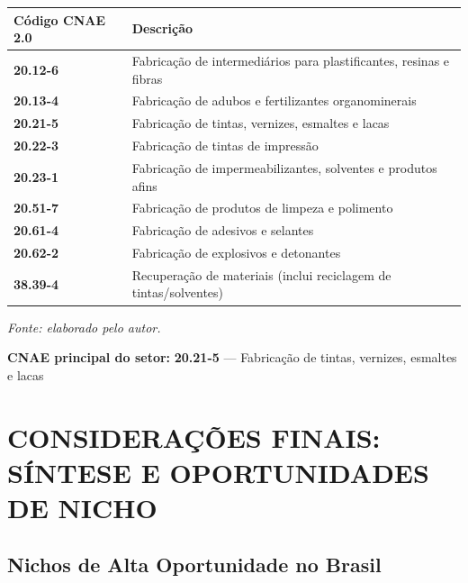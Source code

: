 \documentclass[
  12pt,
  a4paper,
  oneside,
  brazil,
  chapter=TITLE
]{article}
\newcommand{\secbreak}{\clearpage}
\let\oldsection\section
\renewcommand{\section}{\secbreak\oldsection}
\newcommand{\quadrofonte}[1]{\par\noindent\textit{Fonte: #1}\vspace{1em}\par}
\begin{document}
{\def\LTcaptype{none} %
\begin{longtable}[]{@{}
  >{\raggedright\arraybackslash}p{}
  >{\raggedright\arraybackslash}p{}@{}}
\toprule\noalign{}
\begin{minipage}[b]{\linewidth}\raggedright
Código CNAE 2.0
\end{minipage} & \begin{minipage}[b]{\linewidth}\raggedright
Descrição
\end{minipage} \\
\midrule\noalign{}
\endhead
\bottomrule\noalign{}
\endlastfoot
\textbf{20.12-6} & Fabricação de intermediários para plastificantes,
resinas e fibras \\
\textbf{20.13-4} & Fabricação de adubos e fertilizantes
organominerais \\
\textbf{20.21-5} & Fabricação de tintas, vernizes, esmaltes e lacas \\
\textbf{20.22-3} & Fabricação de tintas de impressão \\
\textbf{20.23-1} & Fabricação de impermeabilizantes, solventes e
produtos afins \\
\textbf{20.51-7} & Fabricação de produtos de limpeza e polimento \\
\textbf{20.61-4} & Fabricação de adesivos e selantes \\
\textbf{20.62-2} & Fabricação de explosivos e detonantes \\
\textbf{38.39-4} & Recuperação de materiais (inclui reciclagem de
tintas/solventes) \\
\end{longtable}
}

\quadrofonte{elaborado pelo autor.}

\textbf{CNAE principal do setor:} \textbf{20.21-5} --- Fabricação de
tintas, vernizes, esmaltes e lacas

\section{CONSIDERAÇÕES FINAIS: SÍNTESE E OPORTUNIDADES DE
NICHO}\label{considerauxe7uxf5es-finais-suxedntese-e-oportunidades-de-nicho}

\subsection{Nichos de Alta Oportunidade no
Brasil}\label{nichos-de-alta-oportunidade-no-brasil}
\end{document}
